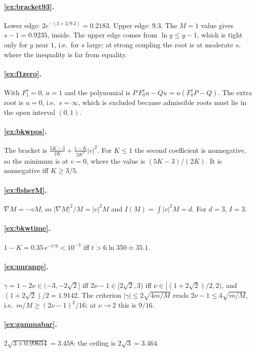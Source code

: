 \documentclass[11pt,a4paper,openany]{book}
\newcommand{\Fzs}{F_0^{s}}
\newcommand{\Fos}{F_1^{s}}
\theoremstyle{definition}
\theoremstyle{plain}
\begin{document}
\paragraph{\ref{ex:bracket93}.} Lower edge: $2e^{-(2+2/9.3)}=0.2183$. Upper edge: $9.3$. The $M=1$
value gives $s-1=0.9235$, inside. The upper edge comes from $\ln y\le y-1$, which is tight only
for $y$ near $1$, i.e.\ for $s$ large; at strong coupling the root is at moderate $s$, where the
inequality is far from equality.

\paragraph{\ref{ex:f1zero}.} With $\Fos=0$, $a=1$ and the polynomial is
$P\,\Fzs u-Qu=u(\Fzs P-Q)$. The extra root is $u=0$, i.e.\ $s=\infty$, which is excluded because
admissible roots must lie in the open interval $(0,1)$.

\paragraph{\ref{ex:bkwpos}.} The bracket is $\frac{5K-3}{2K}+\frac{1-K}{2K^2}|v|^2$. For $K\le1$
the second coefficient is nonnegative, so the minimum is at $v=0$, where the value is
$(5K-3)/(2K)$. It is nonnegative iff $K\ge3/5$.

\paragraph{\ref{ex:fisherM}.} $\nabla M=-vM$, so $|\nabla M|^2/M=|v|^2M$ and
$I(M)=\int|v|^2M=d$. For $d=3$, $I=3$.

\paragraph{\ref{ex:bkwtime}.} $1-K=0.35\,e^{-t/6}<10^{-3}$ iff $t>6\ln350\approx35.1$.

\paragraph{\ref{ex:nurange}.} $\gamma=1-2\nu\in(-3,-2\sqrt2]$ iff $2\nu-1\in[2\sqrt2,3)$ iff
$\nu\in[(1+2\sqrt2)/2,2)$, and $(1+2\sqrt2)/2=1.9142$. The criterion $|\gamma|\le2\sqrt{4m/M}$
reads $2\nu-1\le4\sqrt{m/M}$, i.e.\ $m/M\ge(2\nu-1)^2/16$; at $\nu\to2$ this is $9/16$.

\paragraph{\ref{ex:gammabar}.} $2\sqrt{3\times0.99654}=3.458$; the ceiling is $2\sqrt3=3.464$.
\end{document}
